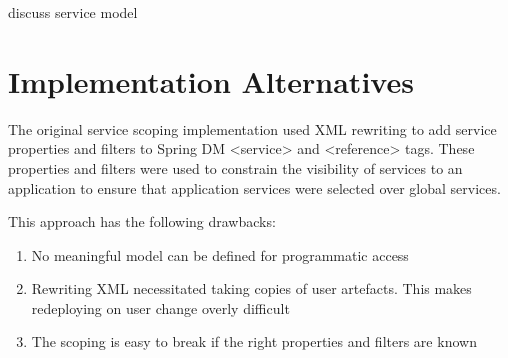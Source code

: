 \documentclass[a4paper]{article}
\begin{document}
discuss service model

\clearpage
\section{Implementation Alternatives}

The original service scoping implementation used XML rewriting to add service properties and filters to Spring DM <service> and <reference> tags. These properties and filters were used to constrain the visibility of services to an application to ensure that application services were selected over global services. 

This approach has the following drawbacks:

\begin{enumerate}
\item No meaningful model can be defined for programmatic access
\item Rewriting XML necessitated taking copies of user artefacts. This makes redeploying on user change overly difficult
\item The scoping is easy to break if the right properties and filters are known
\end{enumerate}
\end{document}
